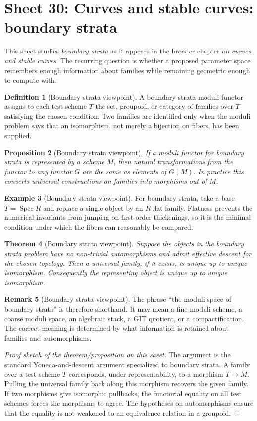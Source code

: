 \documentclass[11pt]{amsart}
\newtheorem{theorem}{Theorem}[section]
\newtheorem{proposition}[theorem]{Proposition}
\theoremstyle{definition}
\newtheorem{definition}[theorem]{Definition}
\newtheorem{example}[theorem]{Example}
\newtheorem{remark}[theorem]{Remark}
\newcommand{\Spec}{\operatorname{Spec}}
\begin{document}
\section{Sheet 30: Curves and stable curves: boundary strata}
This sheet studies \emph{boundary strata} as it appears in the broader chapter on \emph{curves and stable curves}.  The recurring question is whether a proposed parameter space remembers enough information about families while remaining geometric enough to compute with.
\begin{definition}[Boundary strata viewpoint]
A boundary strata moduli functor assigns to each test scheme $T$ the set, groupoid, or category of families over $T$ satisfying the chosen condition.  Two families are identified only when the moduli problem says that an isomorphism, not merely a bijection on fibers, has been supplied.
\end{definition}
\begin{proposition}[Boundary strata viewpoint]
If a moduli functor for boundary strata is represented by a scheme $M$, then natural transformations from the functor to any functor $G$ are the same as elements of $G(M)$.  In practice this converts universal constructions on families into morphisms out of $M$.
\end{proposition}
\begin{example}[Boundary strata viewpoint]
For boundary strata, take a base $T=\Spec R$ and replace a single object by an $R$-flat family.  Flatness prevents the numerical invariants from jumping on first-order thickenings, so it is the minimal condition under which the fibers can reasonably be compared.
\end{example}
\begin{theorem}[Boundary strata viewpoint]
Suppose the objects in the boundary strata problem have no non-trivial automorphisms and admit effective descent for the chosen topology.  Then a universal family, if it exists, is unique up to unique isomorphism.  Consequently the representing object is unique up to unique isomorphism.
\end{theorem}
\begin{remark}[Boundary strata viewpoint]
The phrase ``the moduli space of boundary strata'' is therefore shorthand.  It may mean a fine moduli scheme, a coarse moduli space, an algebraic stack, a GIT quotient, or a compactification.  The correct meaning is determined by what information is retained about families and automorphisms.
\end{remark}
\begin{proof}[Proof sketch of the theorem/proposition on this sheet]
The argument is the standard Yoneda-and-descent argument specialized to boundary strata.  A family over a test scheme $T$ corresponds, under representability, to a morphism $T\to M$.  Pulling the universal family back along this morphism recovers the given family.  If two morphisms give isomorphic pullbacks, the functorial equality on all test schemes forces the morphisms to agree.  The hypotheses on automorphisms ensure that the equality is not weakened to an equivalence relation in a groupoid.
\end{proof}
\end{document}
